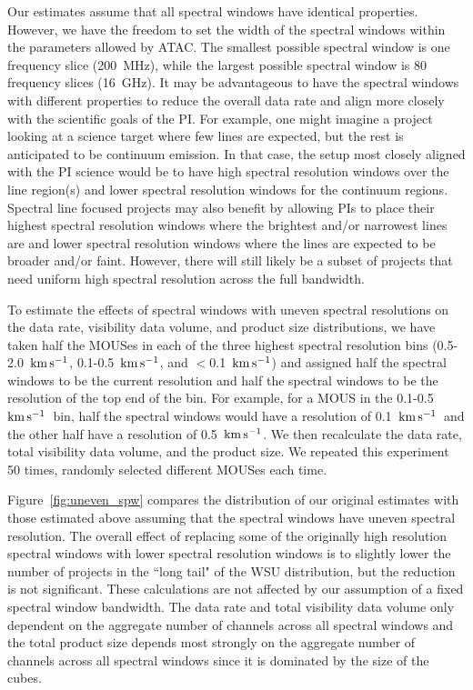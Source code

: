 \documentclass[preprint]{aastex631}
\newcommand{\kms}{\ensuremath{\rm{ km \, s^{-1}}}}
\begin{document}
Our estimates assume that all spectral windows have identical properties. However, we have the freedom to set the width of the spectral windows within the parameters allowed by ATAC. The smallest possible spectral window is one frequency slice (200~MHz), while the largest possible spectral window is 80 frequency slices (16~GHz). It may be advantageous to have the spectral windows with different properties to reduce the overall data rate and align more closely with the scientific goals of the PI.  For example, one might imagine a project looking at a science target where few lines are expected, but the rest is anticipated to be continuum emission. In that case, the setup most closely aligned with the PI science would be to have high spectral resolution windows over the line region(s) and lower spectral resolution windows for the continuum regions. Spectral line focused projects may also benefit by allowing PIs to place their highest spectral resolution windows where the brightest and/or narrowest lines are and lower spectral resolution windows where the lines are expected to be broader and/or faint.   However, there will still likely be a subset of projects that need uniform high spectral resolution across the full bandwidth. 

To estimate the effects of spectral windows with uneven spectral resolutions on the data rate, visibility data volume, and product size distributions, we have taken half the MOUSes in each of the three highest spectral resolution bins (0.5-2.0~\kms, 0.1-0.5~\kms, and $<$0.1~\kms) and assigned half the spectral windows to be the current resolution and half the spectral windows to be the resolution of the top end of the bin. For example, for a MOUS in the 0.1-0.5~\kms\ bin, half the spectral windows would have a resolution of 0.1~\kms\ and the other half have a resolution of 0.5~\kms. We then recalculate the data rate, total visibility data volume, and the product size. We repeated this experiment 50 times, randomly selected different MOUSes each time. 

Figure~\ref{fig:uneven_spw} compares the distribution of our original estimates with those estimated above assuming that the spectral windows have uneven spectral resolution. The overall effect of replacing some of the originally high resolution spectral windows with lower spectral resolution windows is to slightly lower the number of projects in the ``long tail" of the WSU distribution, but the reduction is not significant. These calculations are not affected by our assumption of a fixed spectral window bandwidth. The data rate and total visibility data volume only dependent on the aggregate number of channels across all spectral windows and the total product size depends most strongly on the aggregate number of channels across all spectral windows since it is dominated by the size of the cubes. 
\end{document}
